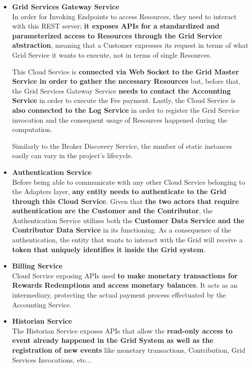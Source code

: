 \begin{itemize}
    \item \textbf{Grid Services Gateway Service}\\
    In order for Invoking Endpoints to access Resources, they need to interact with this REST server; \textbf{it exposes APIs for a standardized and parameterized access to Resources through the Grid Service abstraction}, meaning that a Customer expresses its request in terms of what Grid Service it wants to execute, not in terms of single Resources.
    
    This Cloud Service is \textbf{connected via Web Socket to the Grid Master Service in order to gather the necessary Resources} but, before that, the Grid Services Gateway Service \textbf{needs to contact the Accounting Service} in order to execute the Fee payment. Lastly, the Cloud Service is \textbf{also connected to the Log Service} in order to register the Grid Service invocation and the consequent usage of Resources happened during the computation.

    Similarly to the Broker Discovery Service, the number of static instances easily can vary in the project's lifecycle. 

    \item \textbf{Authentication Service}\\
    Before being able to communicate with any other Cloud Service belonging to the Adapters layer, \textbf{any entity needs to authenticate to the Grid through this Cloud Service}. Given that \textbf{the two actors that require authentication are the Customer and the Contributor}, the Authentication Service utilizes both the \textbf{Customer Data Service and the Contributor Data Service} in its functioning. As a consequence of the authentication, the entity that wants to interact with the Grid will receive a \textbf{token that uniquely identifies it inside the Grid system}.

    \item \textbf{Billing Service}\\
    Cloud Service exposing APIs used \textbf{to make monetary transactions for Rewards Redemptions and access monetary balances}. It acts as an intermediary, protecting the actual payment process effectuated by the Accounting Service.

    \item \textbf{Historian Service}\\
    The Historian Service exposes APIs that allow the \textbf{read-only access to event already happened in the Grid System as well as the registration of new events} like monetary transactions, Contribution, Grid Services Invocations, etc...

\end{itemize}
\vspace{20mm}

